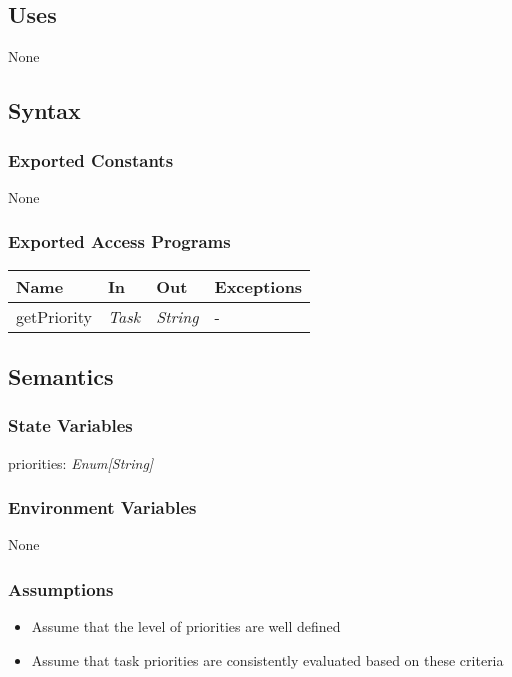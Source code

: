 \documentclass[12pt, titlepage]{article}
\begin{document}
\subsection{Uses}
None

\subsection{Syntax}

\subsubsection{Exported Constants}
None

\subsubsection{Exported Access Programs}

\begin{center}
\begin{tabular}{p{4cm} p{3cm} p{3cm} p{3cm}}
\hline
\textbf{Name} & \textbf{In} & \textbf{Out} & \textbf{Exceptions} \\
\hline
getPriority&  \textit{Task} & \textit{String} & - \\
\hline
\end{tabular}
\end{center}

\subsection{Semantics}

\subsubsection{State Variables}

priorities: \textit{Enum[String]}

\subsubsection{Environment Variables}
None

\subsubsection{Assumptions}

\begin{itemize}
  \item Assume that the level of priorities are well defined
  \item Assume that task priorities are consistently evaluated based on these criteria
\end{itemize}
\end{document}
